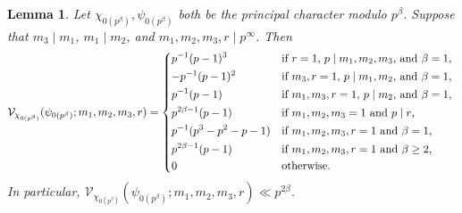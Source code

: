 \documentclass[11pt,a4paper]{amsart}
\newcommand{\VV}{\mathcal{V}}
\numberwithin{equation}{section}
\newtheorem{lemma}[equation]{Lemma}
\theoremstyle{remark}
\theoremstyle{definition}
\begin{document}
\begin{lemma}
\label{lem:VVchiprincprinc}
Let $\chi_{0(p^{\beta})},\psi_{0(p^{\beta})}$ both be the principal character modulo $p^{\beta}$. Suppose that $m_3 \mid m_1$, $m_1 \mid m_2$, and $m_1,m_2,m_3,r \mid p^{\infty}$. Then
\[\VV_{\chi_{0(p^{\beta})}}(\psi_{0(p^{\beta})};m_1,m_2,m_3,r) = \begin{dcases*}
p^{-1} (p - 1)^3 & if $r = 1$, $p \mid m_1,m_2,m_3$, and $\beta = 1$,	\\
-p^{-1} (p - 1)^2 & if $m_3, r = 1$, $p \mid m_1,m_2$, and $\beta = 1$,	\\
p^{-1} (p - 1) & if $m_1, m_3, r = 1$, $p \mid m_2$, and $\beta = 1$,	\\
p^{2\beta - 1} (p - 1) & if $m_1, m_2, m_3 = 1$ and $p \mid r$,	\\
p^{-1} (p^3 - p^2 - p - 1) & if $m_1, m_2, m_3, r = 1$ and $\beta = 1$,	\\
p^{2\beta - 1}(p - 1) & if $m_1, m_2, m_3, r = 1$ and $\beta \geq 2$,	\\
0 & otherwise.
\end{dcases*}\]
In particular, $\VV_{\chi_{0(p^{\beta})}}(\psi_{0(p^{\beta})};m_1,m_2,m_3,r) \ll p^{2\beta}$.
\end{lemma}
\end{document}
